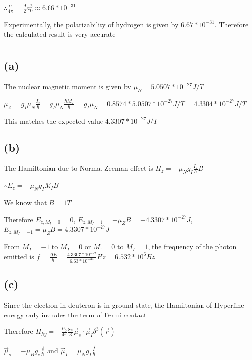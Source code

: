 \documentclass[12pt]{article}
\begin{document}
\begin{spacing}{2.0}
$\therefore \frac{\alpha}{4\pi}= \frac{9}{2} a_0^3 \approx 6.66*10^{-31}$

Experimentally, the polarizability of hydrogen is given by $6.67*10^{-31}$. Therefore the calculated result is very accurate

\section{} %

\subsection*{(a)}

The nuclear magnetic moment is given by $\mu_N= 5.0507*10^{-27} J/T$

$\mu_Z = g_I \mu_N \frac{I_z}{\hbar}= g_I \mu_N\frac{\hbar M_I}{\hbar}= g_I \mu_N= 0.8574*5.0507*10^{-27} J/T = 4.3304*10^{-27} J/T$

This matches the expected value $4.3307*10^{-27} J/T$

\subsection*{(b)}

The Hamiltonian due to Normal Zeeman effect is $H_z= -\mu_N g_I \frac{I_z}{\hbar}B $

$\therefore E_z= -\mu_N g_I M_I B$

We know that $B=1T$

Therefore $E_{z,M_I=0} = 0$, $E_{z,M_I=1} = -\mu_Z B= -4.3307*10^{-27} J$, $E_{z,M_I=-1}= \mu_Z B= 4.3307*10^{-27} J$

From $M_I=-1$ to $M_I=0$ or $M_I=0$ to $M_I=1$, the frequency of the photon emitted is $f=\frac{\Delta E}{h}= \frac{4.3307*10^{-27}}{6.63*10^{-34}} Hz = 6.532*10^{6} Hz$

\subsection*{(c)}

Since the electron in deuteron is in ground state, the Hamiltonian of Hyperfine energy only includes the term of Fermi contact

Therefore $H_{hy}= -\frac{\mu_0}{4\pi} \frac{8\pi}{3} \vec{\mu}_s\cdot \vec{\mu}_I \delta^3(\vec{r})$

$\vec{\mu}_s= -\mu_B g_e\frac{\vec{s}}{\hbar}$ and $\vec{\mu}_I = \mu_N g_I\frac{\vec{I}}{\hbar}$


\end{spacing}
\end{document}
